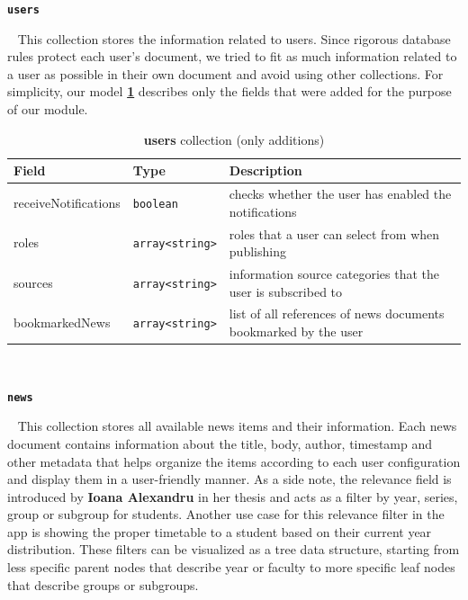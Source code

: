 \faDatabase \hspace{0.1cm} \textbf{\texttt{users}}

~
This collection stores the information related to users. Since rigorous database rules protect each user's document, we tried to fit as much information related to a user as possible in their own document and avoid using other collections. For simplicity, our model \textbf{\ref{5:tab:users}} describes only the fields that were added for the purpose of our module.

\begin{table}[th]\small\linespread{1}
    \centering
    \caption{\textbf{users} collection (only additions)}
    \label{5:tab:users}
    \begin{tabular}{| l | l | p{6.1cm} |}
    \hline
    \textbf{Field} & \textbf{Type} & \textbf{Description} \\
    \hline
    receiveNotifications & \texttt{boolean} & checks whether the user has enabled the notifications
    \\
    \hline
    roles & \texttt{array<string>} & roles that a user can select from when publishing
    \\
    \hline
    sources & \texttt{array<string>} & information source categories that the user is subscribed to
    \\
    \hline
    bookmarkedNews & \texttt{array<string>} & list of all references of news documents bookmarked by the user
    \\
    \hline
    \end{tabular}
\end{table}

~

\faDatabase \hspace{0.1cm} \textbf{\texttt{news}}

~
This collection stores all available news items and their information. Each news document contains information about the title, body, author, timestamp and other metadata that helps organize the items according to each user configuration and display them in a user-friendly manner. As a side note, the relevance field is introduced by \textbf{Ioana Alexandru} in her thesis \cite{ioana-alexandru-relevance-field} and acts as a filter by year, series, group or subgroup for students. Another use case for this relevance filter in the app is showing the proper timetable to a student based on their current year distribution. These filters can be visualized as a tree data structure, starting from less specific parent nodes that describe year or faculty to more specific leaf nodes that describe groups or subgroups.

